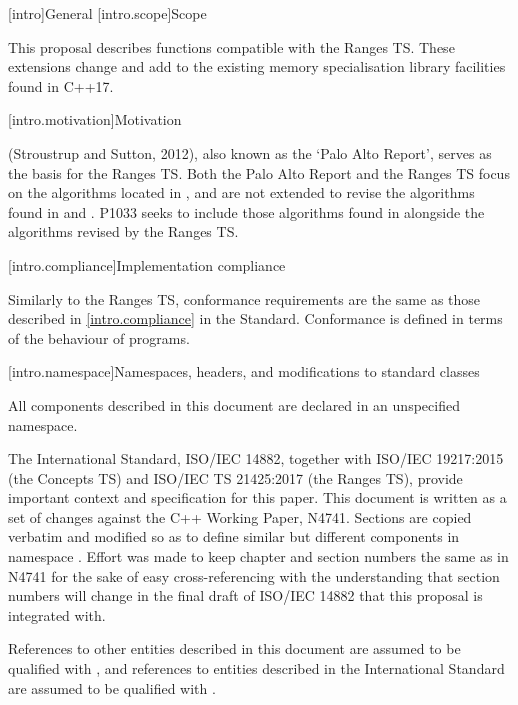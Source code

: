 [intro]{General}
[intro.scope]{Scope}

\pnum
This proposal describes functions compatible with the Ranges TS. These extensions change and add to
the existing memory specialisation library facilities found in C++17.

[intro.motivation]{Motivation}

\pnum
{} (Stroustrup and Sutton, 2012), also known as the
`Palo Alto Report', serves as the basis for the Ranges TS. Both the Palo Alto Report and the Ranges
TS focus on the algorithms located in , and are not extended to revise the
algorithms found in  and . P1033 seeks to include those algorithms
found in  alongside the algorithms revised by the Ranges TS.

[intro.compliance]{Implementation compliance}

\pnum
Similarly to the Ranges TS, conformance requirements are the same as those described in
\ref{intro.compliance} in the \Cpp Standard.
\enternote
Conformance is defined in terms of the behaviour of programs.
\exitnote

[intro.namespace]{Namespaces, headers, and modifications to standard classes}

\pnum
All components described in this document are declared in an unspecified namespace.


\pnum
The International Standard, ISO/IEC 14882, together with ISO/IEC 19217:2015 (the Concepts TS) and
ISO/IEC TS 21425:2017 (the Ranges TS), provide important context and specification for this paper.
This document is written as a set of changes against the C++ Working Paper, N4741. Sections are
copied verbatim and modified so as to define similar but different components in namespace .
Effort was made to keep chapter and section numbers the same as in N4741 for the sake of easy
cross-referencing with the understanding that section numbers will change in the final draft of
ISO/IEC 14882 that this proposal is integrated with.

\pnum
References to other entities described in this document are assumed to be qualified with
, and references to entities described in the International Standard are
assumed to be qualified with .

